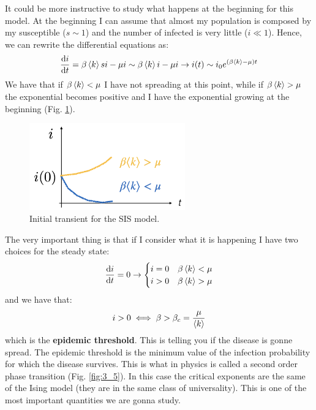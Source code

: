 \documentclass[../main/main.tex]{subfiles}
\begin{document}
It could be more instructive to study what happens at the beginning for this model. At the beginning I can assume that almost my population is composed by my susceptible (\( s \sim 1 \)) and the number of infected is very little (\( i \ll 1 \)).
Hence, we can rewrite the differential equations as:
\begin{equation*}
  \dv{i}{t} = \beta \expval{k} s i - \mu i \sim \beta \expval{k} i - \mu i \rightarrow i(t) \sim i_0 e^{(\beta \expval{k} - \mu  )t}
\end{equation*}
We have that if \( \beta \expval{k} < \mu   \) I have not spreading at this point, while if \( \beta \expval{k} > \mu   \) the exponential becomes positive and I have the exponential growing at the beginning (Fig. \ref{fig:3_4}).

\begin{figure}[h!]
\centering
\includegraphics[width=0.6\textwidth]{../lessons/image/03/4.png}
\caption{\label{fig:3_4} Initial transient for the SIS model.}
\end{figure}

The very important thing is that if I consider what it is happening I have two choices for the steady state:
\begin{equation*}
  \dv{i}{t} = 0 \rightarrow  \begin{cases}
   i=0 & \beta \expval{k} < \mu  \\
   i>0 & \beta \expval{k} > \mu
  \end{cases}
\end{equation*}
and we have that:
\begin{equation*}
  i>0 \iff \beta > \beta_c = \frac{\mu }{ \expval{k} }
\end{equation*}
which is the \textbf{epidemic threshold}. This is telling you if the disease is gonne spread.
The epidemic threshold is the minimum value of the infection probability for which the disease survives. This is what in physics is called a second order phase transition (Fig. \ref{fig:3_5}). In this case the critical exponents are the same of the Ising model (they are in the same class of universality).
This is one of the most important quantities we are gonna study.
\end{document}
